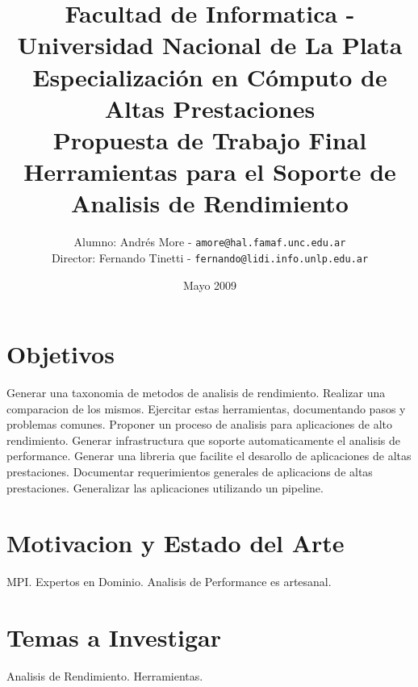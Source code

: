 \documentclass[a4paper,twocolumn]{article}
\begin{document}
\title{Facultad de Informatica - Universidad Nacional de La Plata\\Especializaci\'on en C\'omputo de Altas Prestaciones\\Propuesta de Trabajo Final\\Herramientas para el Soporte de Analisis de Rendimiento}
\author{Alumno: Andr\'es More - {\tt amore@hal.famaf.unc.edu.ar}\\Director: Fernando Tinetti - {\tt fernando@lidi.info.unlp.edu.ar}}
\date{Mayo 2009}


\tableofcontents

\section{Objetivos}

Generar una taxonomia de metodos de analisis de rendimiento.
Realizar una comparacion de los mismos.
Ejercitar estas herramientas, documentando pasos y problemas comunes.
Proponer un proceso de analisis para aplicaciones de alto rendimiento.
Generar infrastructura que soporte automaticamente el analisis de performance.
Generar una libreria que facilite el desarollo de aplicaciones de altas prestaciones.
Documentar requerimientos generales de aplicacions de altas prestaciones.
Generalizar las aplicaciones utilizando un pipeline.

\section{Motivacion y Estado del Arte}

MPI.
Expertos en Dominio.
Analisis de Performance es artesanal.

\section{Temas a Investigar}

Analisis de Rendimiento.
Herramientas.
\end{document}
